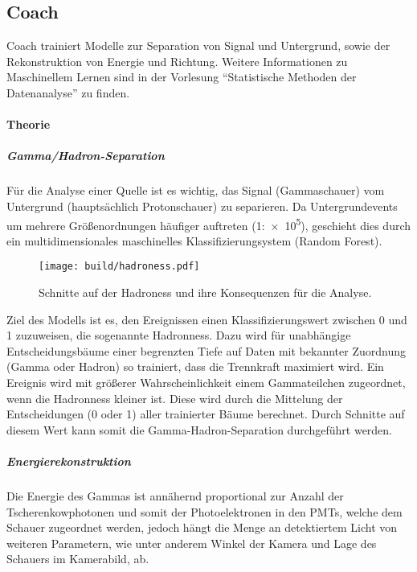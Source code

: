 \subsection{Coach}%
\label{sub:coach}

Coach trainiert Modelle zur Separation von Signal und Untergrund,
sowie der Rekonstruktion von Energie und Richtung.
Weitere Informationen zu Maschinellem Lernen sind in der Vorlesung
\enquote{Statistische Methoden der Datenanalyse} zu finden.

\paragraph{Theorie}%

\subparagraph{Gamma/Hadron-Separation}
Für die Analyse einer Quelle ist es wichtig,
das Signal (Gammaschauer) vom
Untergrund (hauptsächlich Protonschauer) zu separieren.
Da Untergrundevents um mehrere Größenordnungen häufiger auftreten (1:\num{e5}),
geschieht dies durch ein multidimensionales maschinelles
Klassifizierungsystem (Random Forest).

\begin{wrapfigure}[18]{L}{0.55\textwidth}
  \centering
  \texttt{[image: build/hadroness.pdf]}
  \caption{Schnitte auf der Hadroness und ihre Konsequenzen für die Analyse.}%
  \label{fig:uebersicht}
\end{wrapfigure}

Ziel des Modells ist es,
den Ereignissen einen Klassifizierungswert zwischen 0 und 1 zuzuweisen,
die sogenannte Hadronness.
Dazu wird für unabhängige Entscheidungsbäume einer begrenzten Tiefe
auf Daten mit bekannter Zuordnung (Gamma oder Hadron) so trainiert, dass die
Trennkraft maximiert wird.
Ein Ereignis wird mit größerer Wahrscheinlichkeit einem
Gammateilchen zugeordnet, wenn die Hadronness kleiner ist.
Diese wird durch die Mittelung der Entscheidungen (0 oder 1) aller trainierter
Bäume berechnet.
Durch Schnitte auf diesem Wert kann somit die Gamma-Hadron-Separation durchgeführt werden.

\subparagraph{Energierekonstruktion}%
\label{par:energie}

Die Energie des Gammas ist annähernd proportional
zur Anzahl der Tscherenkowphotonen
und somit der Photoelektronen
in den PMTs, welche dem Schauer zugeordnet werden,
jedoch hängt die Menge an detektiertem Licht von weiteren Parametern,
wie unter anderem Winkel der Kamera und Lage des Schauers im Kamerabild, ab.

